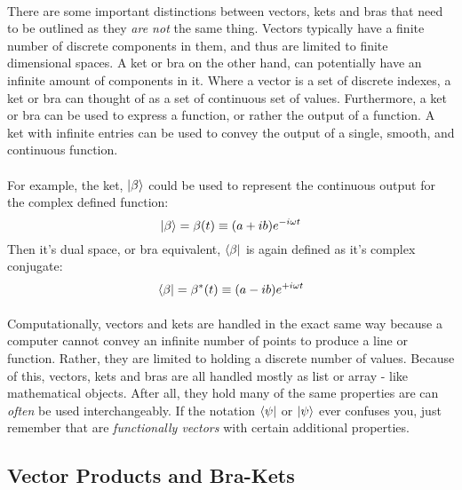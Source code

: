 \documentclass[12pt,letterpaper]{book}
\begin{document}
\paragraph*{}There are some important distinctions between vectors, kets and bras that need to be outlined as they \textit{are not} the same thing. Vectors typically have a finite number of discrete components in them, and thus are limited to finite dimensional spaces. A ket or bra on the other hand, can potentially have an infinite amount of components in it. Where a vector is a set of discrete indexes, a ket or bra can thought of as a set of continuous set of values. Furthermore, a ket or bra can be used to express a function, or rather the output of a function. A ket with infinite entries can be used to convey the output of a single, smooth, and continuous function.

\paragraph*{}For example, the ket, $\ket{\beta}$ could be used to represent the continuous output for the complex defined function:
\begin{equation}
\label{smooth ket}
\ket{\beta} = \beta(t) \equiv (a + ib) e^{-i\omega t}
\end{equation}
Then it's dual space, or bra equivalent, $\bra{\beta}$ is again defined as it's  complex conjugate: 
\begin{equation}
\label{smooth bra}
\bra{\beta} = \beta^*(t) \equiv (a - ib) e^{+i\omega t}
\end{equation}

\paragraph*{}Computationally, vectors and kets are handled in the exact same way because a computer cannot convey an infinite number of points to produce a line or function. Rather, they are limited to holding a discrete number of values. Because of this, vectors, kets and bras are all handled mostly as list or array - like mathematical objects. After all, they hold many of the same properties are can \textit{often} be used interchangeably. If the notation $\bra{\psi}$ or $\ket{\psi}$ ever confuses you, just remember that are \textit{functionally vectors} with certain additional properties.


\subsection*{Vector Products and Bra-Kets}
\end{document}
